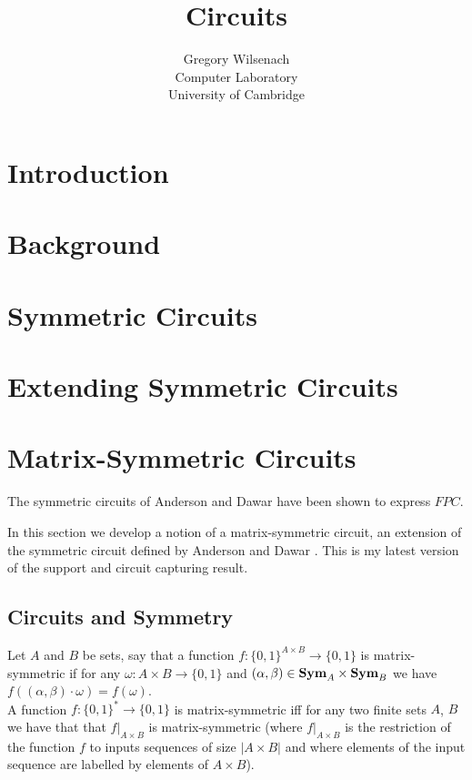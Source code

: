 \documentclass[12pt]{report}
\newcommand{\sym}{\text{\textbf{Sym}}}
\begin{document}
\nocite{*}

\title{Circuits}

\author{Gregory Wilsenach \\ 
Computer Laboratory \\
University of Cambridge}

\maketitle

\tableofcontents

\chapter{Introduction}

\chapter{Background}

\chapter{Symmetric Circuits}

\chapter{Extending Symmetric Circuits}

\chapter{Matrix-Symmetric Circuits}

The symmetric circuits of Anderson and Dawar \cite{} have been shown to express
$FPC$.

In this section we develop a notion of a matrix-symmetric circuit, an extension
of the symmetric circuit defined by Anderson and Dawar \cite{}. This is my
latest version of the support and circuit capturing result.

\section{Circuits and Symmetry}
\begin{definition}
  Let $A$ and $B$ be sets, say that a function $f: \{ 0,1 \}^{A \times B}
  \rightarrow \{ 0,1 \}$ is matrix-symmetric if for any $\omega: A \times B
  \rightarrow \{0, 1\}$ and $(\alpha, \beta) \in \sym_A \times \sym_B$ we have
  $f((\alpha, \beta)\cdot \omega) = f (\omega)$.
  \\
  A function $f: \{0,1\}^* \rightarrow \{0,1\}$ is matrix-symmetric iff for any
  two finite sets $A$, $B$ we have that that $f|_{A \times B}$ is
  matrix-symmetric (where $f|_{A \times B}$ is the restriction of the function
  $f$ to inputs sequences of size $\vert A \times B \vert$ and where elements of
  the input sequence are labelled by elements of $A \times B$).
\end{definition}
\end{document}
